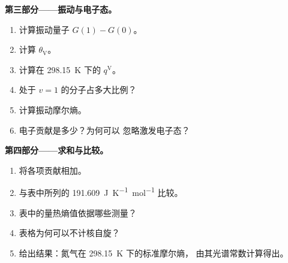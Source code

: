 \begin{problem}
\medskip\noindent\textbf{第三部分——振动与电子态。}
\begin{enumerate}[resume]
  \item 计算振动量子 $G(1) - G(0)$。
  \item 计算 $\theta_{\mathrm V}$。
  \item 计算在 \qty{298.15}{K} 下的 $q^{\mathrm V}$。
  \item 处于 $v = 1$ 的分子占多大比例？
  \item 计算振动摩尔熵。
  \item 电子贡献是多少？为何可以
        忽略激发电子态？
\end{enumerate}

\medskip\noindent\textbf{第四部分——求和与比较。}
\begin{enumerate}[resume]
  \item 将各项贡献相加。
  \item 与表中所列的 \qty{191.609}{J.K^{-1}.mol^{-1}} 比较。
  \item 表中的量热熵值依据哪些测量？
  \item 表格为何可以不计核自旋？
  \item 给出结果：氮气在 \qty{298.15}{K} 下的标准摩尔熵，
        由其光谱常数计算得出。
\end{enumerate}
\end{problem}
